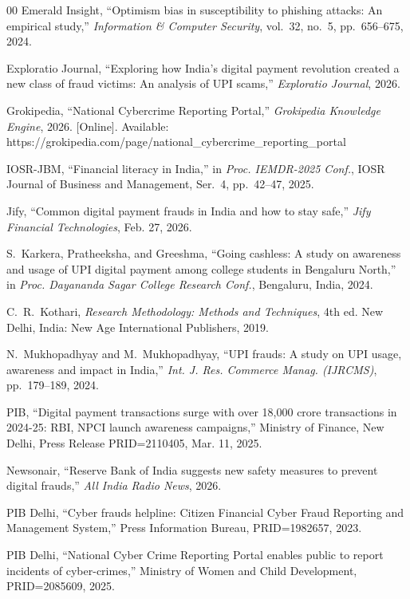 \documentclass[journal,10pt,twocolumn]{IEEEtran}
\begin{document}
\begin{thebibliography}{00}
 Emerald Insight, ``Optimism bias in susceptibility to phishing attacks: An empirical study,'' \textit{Information \& Computer Security}, vol.~32, no.~5, pp.~656--675, 2024.

 Exploratio Journal, ``Exploring how India's digital payment revolution created a new class of fraud victims: An analysis of UPI scams,'' \textit{Exploratio Journal}, 2026.

 Grokipedia, ``National Cybercrime Reporting Portal,'' \textit{Grokipedia Knowledge Engine}, 2026. [Online]. Available: https://grokipedia.com/page/national\_cybercrime\_reporting\_portal

 IOSR-JBM, ``Financial literacy in India,'' in \textit{Proc. IEMDR-2025 Conf.}, IOSR Journal of Business and Management, Ser.~4, pp.~42--47, 2025.

 Jify, ``Common digital payment frauds in India and how to stay safe,'' \textit{Jify Financial Technologies}, Feb. 27, 2026.

 S.~Karkera, Pratheeksha, and Greeshma, ``Going cashless: A study on awareness and usage of UPI digital payment among college students in Bengaluru North,'' in \textit{Proc. Dayananda Sagar College Research Conf.}, Bengaluru, India, 2024.

 C.~R.~Kothari, \textit{Research Methodology: Methods and Techniques}, 4th ed. New Delhi, India: New Age International Publishers, 2019.

 N.~Mukhopadhyay and M.~Mukhopadhyay, ``UPI frauds: A study on UPI usage, awareness and impact in India,'' \textit{Int. J. Res. Commerce Manag. (IJRCMS)}, pp.~179--189, 2024.

 PIB, ``Digital payment transactions surge with over 18,000 crore transactions in 2024-25: RBI, NPCI launch awareness campaigns,'' Ministry of Finance, New Delhi, Press Release PRID=2110405, Mar. 11, 2025.

 Newsonair, ``Reserve Bank of India suggests new safety measures to prevent digital frauds,'' \textit{All India Radio News}, 2026.

 PIB Delhi, ``Cyber frauds helpline: Citizen Financial Cyber Fraud Reporting and Management System,'' Press Information Bureau, PRID=1982657, 2023.

 PIB Delhi, ``National Cyber Crime Reporting Portal enables public to report incidents of cyber-crimes,'' Ministry of Women and Child Development, PRID=2085609, 2025.


\end{thebibliography}
\end{document}
